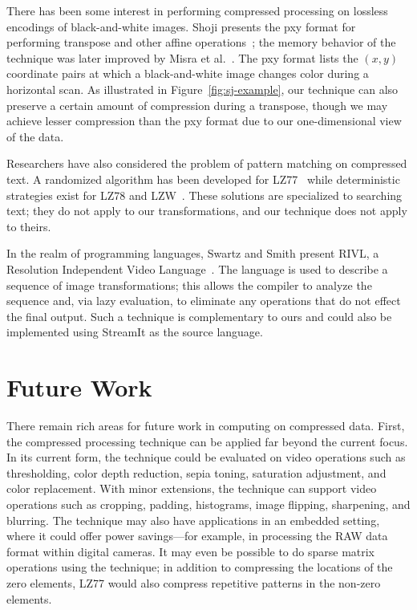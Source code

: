 There has been some interest in performing compressed processing on
lossless encodings of black-and-white images.  Shoji presents the pxy
format for performing transpose and other affine
operations~\cite{shoji95}; the memory behavior of the technique was
later improved by Misra et al.~\cite{misra99}.  
The pxy format lists the $(x,y)$ coordinate pairs at which a
black-and-white image changes color during a horizontal scan.  As
illustrated in Figure~\ref{fig:sj-example}, our technique can also
preserve a certain amount of compression during a transpose, though we
may achieve lesser compression than the pxy format due to our
one-dimensional view of the data.

Researchers have also considered the problem of pattern matching on
compressed text.  A randomized algorithm has been developed for
LZ77~\cite{farach98matching} while deterministic strategies exist for
LZ78 and LZW~\cite{navarro03regular,navarro05lzgrep}.  These solutions
are specialized to searching text; they do not apply to our
transformations, and our technique does not apply to theirs.

In the realm of programming languages, Swartz and Smith present RIVL,
a Resolution Independent Video Language~\cite{swartz95}.  The language
is used to describe a sequence of image transformations; this allows
the compiler to analyze the sequence and, via lazy evaluation, to
eliminate any operations that do not effect the final output.  Such a
technique is complementary to ours and could also be implemented using
StreamIt as the source language.

\section{Future Work}
\label{sec:future}


There remain rich areas for future work in computing on compressed
data.  First, the compressed processing technique can be applied far
beyond the current focus.  In its current form, the technique could be
evaluated on video operations such as thresholding, color depth
reduction, sepia toning, saturation adjustment, and color replacement.
With minor extensions, the technique can support video operations such
as cropping, padding, histograms, image flipping, sharpening, and
blurring.  The technique may also have applications in an embedded
setting, where it could offer power savings---for example, in
processing the RAW data format within digital cameras.  It may even be
possible to do sparse matrix operations using the technique; in
addition to compressing the locations of the zero elements, LZ77 would
also compress repetitive patterns in the non-zero elements.

